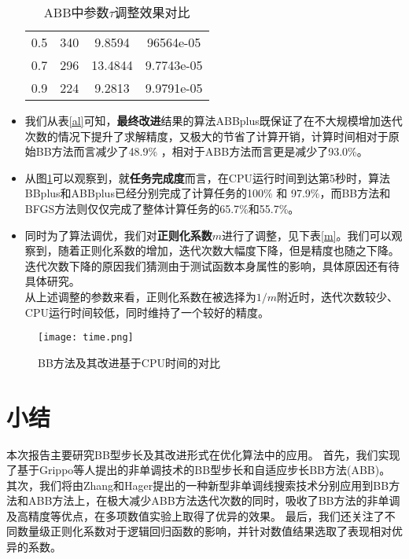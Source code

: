 \begin{itemize}
\begin{table}[thp]
\begin{tabular}{cccc}
		0.5 & 340 &  9.8594 & 96564e-05 \\
		
		0.7 & 296 &  13.4844 &  9.7743e-05\\
		
		0.9 & 224 & 9.2813 &  9.9791e-05\\
		\hline
	\end{tabular}
	\caption{ABB中参数$ \tau $调整效果对比}
	\label{ABBtau}
\end{table}

\item 我们从表\ref{al}可知，\textbf{最终改进}结果的算法ABBplus既保证了在不大规模增加迭代次数的情况下提升了求解精度，又极大的节省了计算开销，计算时间相对于原始BB方法而言减少了48.9\% ，相对于ABB方法而言更是减少了93.0\%。



\item 从图\ref{time}可以观察到，就\textbf{任务完成度}而言，在CPU运行时间到达第5秒时，算法BBplus和ABBplus已经分别完成了计算任务的100\% 和 97.9\%，而BB方法和BFGS方法则仅仅完成了整体计算任务的65.7\%和55.7\%。


\item 同时为了算法调优，我们对\textbf{正则化系数$ m $}进行了调整，见下表\ref{m}。我们可以观察到，随着正则化系数的增加，迭代次数大幅度下降，但是精度也随之下降。迭代次数下降的原因我们猜测由于测试函数本身属性的影响，具体原因还有待具体研究。\\
从上述调整的参数来看，正则化系数在被选择为$ 1/m $附近时，迭代次数较少、CPU运行时间较低，同时维持了一个较好的精度。
\end{itemize}

\begin{figure}
	\centering
	\texttt{[image: time.png]}
	\caption{BB方法及其改进基于CPU时间的对比}
	\label{time}
\end{figure}


\chapter{\hei 小结}

本次报告主要研究BB型步长及其改进形式在优化算法中的应用。
首先，我们实现了基于Grippo等人提出的非单调技术\cite{grippo1991class}的BB型步长\cite{barzilai1988two}和自适应步长BB方法(ABB)\cite{zhou2006gradient}。
其次，我们将由Zhang和Hager提出的一种新型非单调线搜索技术\cite{zhang2004nonmonotone}分别应用到BB方法和ABB方法上，在极大减少ABB方法迭代次数的同时，吸收了BB方法的非单调及高精度等优点，在多项数值实验上取得了优异的效果。
最后，我们还关注了不同数量级正则化系数对于逻辑回归函数的影响，并针对数值结果选取了表现相对优异的系数。